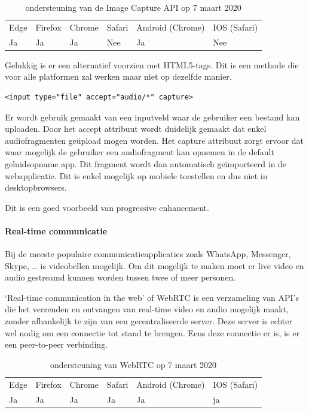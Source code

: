 \begin{table}[H]
	\centering
	\begin{tabular}{llllll}
		Edge & Firefox & Chrome & Safari & Android (Chrome) & IOS (Safari) \\
		Ja   & Ja      & Ja     & Nee     & Ja               & Nee          
	\end{tabular}	
	\caption{ondersteuning van de Image Capture API op 7 maart 2020}
\end{table}

Gelukkig is er een alternatief voorzien met HTML5-tags. Dit is een methode die voor alle platformen zal werken maar niet op dezelfde manier.

\begin{lstlisting}
<input type="file" accept="audio/*" capture>
\end{lstlisting}

Er wordt gebruik gemaakt van een inputveld waar de gebruiker een bestand kan uploaden. Door het accept attribuut wordt duidelijk gemaakt dat enkel audiofragmenten geüpload mogen worden. Het capture attribuut zorgt ervoor dat waar mogelijk de gebruiker een audiofragment kan opnemen in de default geluidsopname app. Dit fragment wordt dan automatisch geïmporteerd in de webapplicatie. Dit is enkel mogelijk op mobiele toestellen en dus niet in desktopbrowsers.

\autocite{Kinlan2019}

Dit is een goed voorbeeld van progressive enhancement. 



\paragraph{Real-time communicatie }



Bij de meeste populaire communicatieapplicaties zoals WhatsApp, Messenger, Skype, … is videobellen mogelijk. Om dit mogelijk te maken moet er live video en audio gestreamd kunnen worden tussen twee of meer personen.

‘Real-time communication in the web’ of WebRTC \autocite{Jennings2019} is een verzameling van API’s die het verzenden en ontvangen van real-time video en audio mogelijk maakt, zonder afhankelijk te zijn van een gecentraliseerde server. Deze server is echter wel nodig om een connectie tot stand te brengen. Eens deze connectie er is, is er een peer-to-peer verbinding.

\begin{table}[H]
	\centering
	\begin{tabular}{llllll}
		Edge & Firefox & Chrome & Safari & Android (Chrome) & IOS (Safari) \\
		Ja   & Ja      & Ja     & Ja     & Ja               & ja          
	\end{tabular}	
	\caption{ondersteuning van WebRTC op 7 maart 2020}
\end{table}




